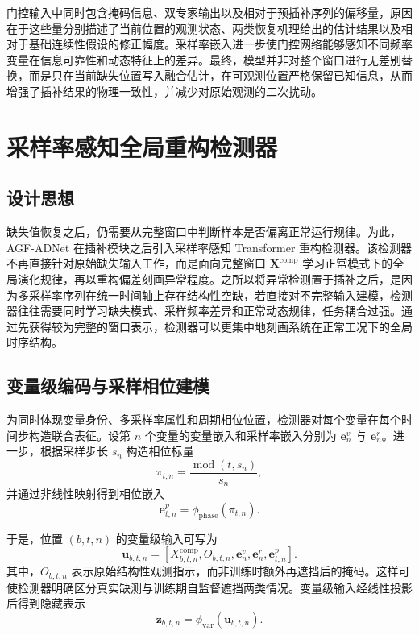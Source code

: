 门控输入中同时包含掩码信息、双专家输出以及相对于预插补序列的偏移量，原因在于这些量分别描述了当前位置的观测状态、两类恢复机理给出的估计结果以及相对于基础连续性假设的修正幅度。采样率嵌入进一步使门控网络能够感知不同频率变量在信息可靠性和动态特征上的差异。最终，模型并非对整个窗口进行无差别替换，而是只在当前缺失位置写入融合估计，在可观测位置严格保留已知信息，从而增强了插补结果的物理一致性，并减少对原始观测的二次扰动。

\section{采样率感知全局重构检测器}

\subsection{设计思想}

缺失值恢复之后，仍需要从完整窗口中判断样本是否偏离正常运行规律。为此，AGF-ADNet 在插补模块之后引入采样率感知 Transformer 重构检测器。该检测器不再直接针对原始缺失输入工作，而是面向完整窗口 $\mathbf{X}^{\mathrm{comp}}$ 学习正常模式下的全局演化规律，再以重构偏差刻画异常程度。之所以将异常检测置于插补之后，是因为多采样率序列在统一时间轴上存在结构性空缺，若直接对不完整输入建模，检测器往往需要同时学习缺失模式、采样频率差异和正常动态规律，任务耦合过强。通过先获得较为完整的窗口表示，检测器可以更集中地刻画系统在正常工况下的全局时序结构。

\subsection{变量级编码与采样相位建模}

为同时体现变量身份、多采样率属性和周期相位位置，检测器对每个变量在每个时间步构造联合表征。设第 $n$ 个变量的变量嵌入和采样率嵌入分别为 $\mathbf{e}_n^{v}$ 与 $\mathbf{e}_n^{r}$。进一步，根据采样步长 $s_n$ 构造相位标量
\begin{equation}
    \pi_{t,n} = \frac{\operatorname{mod}(t,s_n)}{s_n},
\end{equation}
并通过非线性映射得到相位嵌入
\begin{equation}
    \mathbf{e}_{t,n}^{p} = \phi_{\mathrm{phase}}(\pi_{t,n}).
\end{equation}

于是，位置 $(b,t,n)$ 的变量级输入可写为
\begin{equation}
    \mathbf{u}_{b,t,n}
    =
    \left[
        X_{b,t,n}^{\mathrm{comp}},
        O_{b,t,n},
        \mathbf{e}_n^{v},
        \mathbf{e}_n^{r},
        \mathbf{e}_{t,n}^{p}
    \right].
\end{equation}
其中，$O_{b,t,n}$ 表示原始结构性观测指示，而非训练时额外再遮挡后的掩码。这样可使检测器明确区分真实缺测与训练期自监督遮挡两类情况。变量级输入经线性投影后得到隐藏表示
\begin{equation}
    \mathbf{z}_{b,t,n} = \phi_{\mathrm{var}}(\mathbf{u}_{b,t,n}).
\end{equation}

